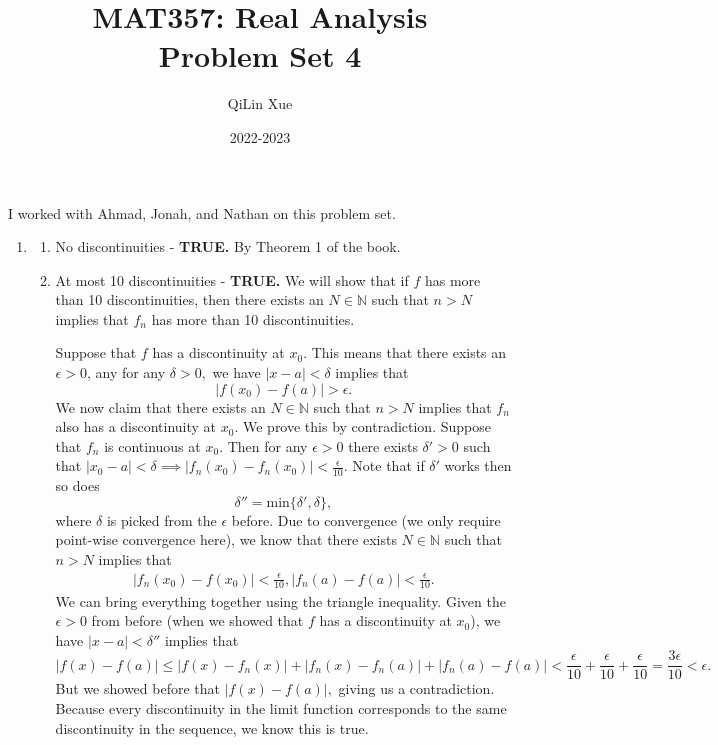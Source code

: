 \documentclass{article}
\title{\vspace{-2cm}MAT357: Real Analysis \\ Problem Set 4}
\author{QiLin Xue}
\date{2022-2023}
\numberwithin{equation}{section}
\begin{document}
\maketitle
I worked with Ahmad, Jonah, and Nathan on this problem set.
\begin{enumerate}
    \item \begin{enumerate}[label=(\alph*)]
        \item No discontinuities - \textbf{TRUE.} By Theorem 1 of the book.
        \item At most 10 discontinuities - \textbf{TRUE.} We will show that if $f$ has more than 10 discontinuities, then there exists an $N\in \mathbb{N}$ such that $n>N$ implies that $f_n$ has more than 10 discontinuities.
        
        Suppose that $f$ has a discontinuity at $x_0$. This means that there exists an $\epsilon > 0$, any for any $\delta > 0,$ we have $|x-a|<\delta$ implies that 
        \begin{equation}
            |f(x_0)-f(a)| > \epsilon.
        \end{equation}
        We now claim that there exists an $N\in \mathbb{N}$ such that $n>N$ implies that $f_n$ also has a discontinuity at $x_0.$ We prove this by contradiction. Suppose that $f_n$ is continuous at $x_0.$ Then for any $\epsilon > 0$ there exists $\delta' > 0$ such that $|x_0-a|<\delta \implies |f_n(x_0)-f_n(x_0)|< \frac{\epsilon}{10}.$ Note that if $\delta'$ works then so does 
        \begin{equation}
            \delta'' = \text{min}\{\delta',\delta\},
        \end{equation}
        where $\delta$ is picked from the $\epsilon$ before. Due to convergence (we only require point-wise convergence here), we know that there exists $N\in \mathbb{N}$ such that $n>N$ implies that 
        \begin{align}
            |f_n(x_0)- f(x_0)| < \frac{\epsilon}{10},|f_n(a)- f(a)| < \frac{\epsilon}{10}.
        \end{align}
        We can bring everything together using the triangle inequality. Given the $\epsilon > 0$ from before (when we showed that $f$ has a discontinuity at $x_0$), we have $|x-a|<\delta''$ implies that 
        \begin{equation}
            |f(x)-f(a)| \le |f(x) - f_n(x)| + |f_n(x) - f_n(a)| + |f_n(a) - f(a)| < \frac{\epsilon}{10} + \frac{\epsilon}{10} + \frac{\epsilon}{10} = \frac{3\epsilon}{10} < \epsilon.
        \end{equation}
        But we showed before that $ |f(x)-f(a)|,$ giving us a contradiction. Because every discontinuity in the limit function corresponds to the same discontinuity in the sequence, we know this is true.


\end{enumerate}
\end{enumerate}
\end{document}
